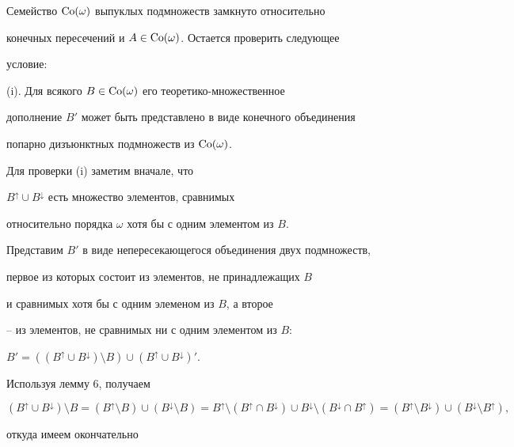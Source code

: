  


\begin{pf} 


Семейство $\operatorname{Co}(\omega)$ выпуклых подмножеств замкнуто относительно 


конечных пересечений и $A\in\operatorname{Co}(\omega)$. Остается проверить следующее 


условие: 


 


(i). Для всякого $B\in\operatorname{Co}(\omega)$ его теоретико-множественное 


дополнение $B'$ может быть представлено в виде конечного объединения 


попарно дизъюнктных подмножеств из $\operatorname{Co}(\omega)$. 


 


Для проверки (i) заметим вначале, что 


$B^\uparrow\cup B^\downarrow$ есть множество элементов, сравнимых 


относительно порядка $\omega$ хотя бы с одним элементом из $B$. 


Представим $B'$ в виде непересекающегося объединения двух подмножеств, 


первое из которых состоит из элементов, не принадлежащих $B$


и сравнимых хотя бы с одним элеменом из $B$, а второе 


-- из элементов, не сравнимых ни с одним элементом из $B$: 


$B'=((B^\uparrow\cup B^\downarrow)\setminus B)\cup 


(B^\uparrow\cup B^\downarrow)'$. 


Используя лемму 6, получаем 


$$ 


(B^\uparrow\cup B^\downarrow)\setminus B= 


(B^\uparrow\setminus B)\cup(B^\downarrow\setminus B)= 


B^\uparrow\setminus(B^\uparrow\cap B^\downarrow)\cup 


B^\downarrow\setminus(B^\downarrow\cap B^\uparrow)= 


(B^\uparrow\setminus B^\downarrow)\cup 


(B^\downarrow\setminus B^\uparrow), 


$$ 


откуда имеем окончательно 


\begin{equation} 



\end{equation}
\end{pf}
